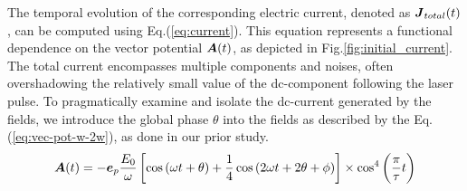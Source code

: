 The temporal evolution of the corresponding electric current, denoted as $\boldsymbol{J}_{total}(t)$, can be computed using Eq.(\ref{eq:current}). This equation represents a functional dependence on the vector potential $\boldsymbol{A}(t)$, as depicted in Fig.\ref{fig:initial_current}. The total current encompasses multiple components and noises, often overshadowing the relatively small value of the dc-component following the laser pulse. To pragmatically examine and isolate the dc-current generated by the fields, we introduce the global phase $\theta$ into the fields as described by the Eq.(\ref{eq:vec-pot-w-2w}), as done in our prior study\cite{sato2023limitations}.
\begin{equation}
\boldsymbol{A}(t) = -\boldsymbol{e}_p \frac{E_0}{\omega} \left [
\cos \left (\omega t + \theta \right ) + \frac{1}{4}\cos
\left (2\omega t + 2\theta + \phi \right )
\right ] \nonumber \times \cos^4 \left (\frac{\pi}{\tau}t \right )
\label{eq:vec-pot-w-2w}
\end{equation}

